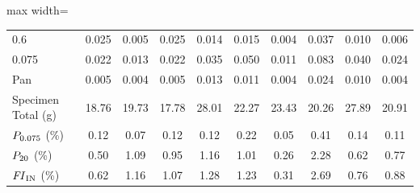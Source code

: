 \begin{table}[H]
\begin{adjustbox}{max width=\textwidth}
\begin{tabular}{@{}lccccccccc@{}}
    0.6   & 0.025 & 0.005 & 0.025 & 0.014 & 0.015 & 0.004 & 0.037 & 0.010 & 0.006\\
    0.075 & 0.022 & 0.013 & 0.022 & 0.035 & 0.050 & 0.011 & 0.083 & 0.040 & 0.024\\
    Pan   & 0.005 & 0.004 & 0.005 & 0.013 & 0.011 & 0.004 & 0.024 & 0.010 & 0.004\\
    \midrule
    \rowcolor{gsvlight}
    Specimen Total (\si{\gram})
          & 18.76 & 19.73 & 17.78 & 28.01 & 22.27 & 23.43 & 20.26 & 27.89 & 20.91\\
    \rowcolor{gsvlight}
    $P_{0.075}$ (\si{\percent})
          & 0.12  & 0.07  & 0.12  & 0.12  & 0.22  & 0.05  & 0.41  & 0.14  & 0.11\\
    \rowcolor{gsvlight}
    $P_{20}$ (\si{\percent})
          & 0.50  & 1.09  & 0.95  & 1.16  & 1.01  & 0.26  & 2.28  & 0.62  & 0.77\\
    \rowcolor{gsvlight}
    $\mathit{FI}_{\mathrm{IN}}$ (\si{\percent})
          & 0.62  & 1.16  & 1.07  & 1.28  & 1.23  & 0.31  & 2.69  & 0.76  & 0.88\\
    \bottomrule
\end{tabular}
\end{adjustbox}
\end{table}
